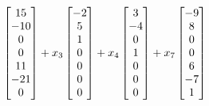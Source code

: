 \documentclass{ximera}
\begin{document}
\begin{example}
\begin{align*}
    \begin{bmatrix}15\\ -10\\ 0\\ 0\\ 11\\ -21\\ 0\end{bmatrix}+
    x_3\begin{bmatrix}-2\\ 5\\ 1\\ 0\\ 0\\ 0\\ 0\end{bmatrix}+
    x_4\begin{bmatrix}3\\ -4\\ 0\\ 1\\ 0\\ 0\\ 0\end{bmatrix}+
    x_7\begin{bmatrix}-9\\ 8\\ 0\\ 0\\ 6\\ -7\\ 1\end{bmatrix}
  \end{align*}


\end{example}
\end{document}

